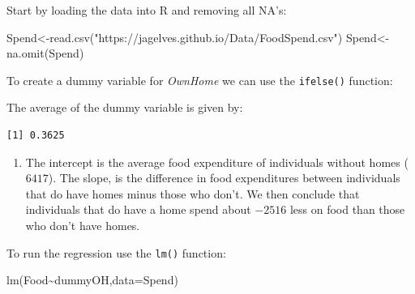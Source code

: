 \documentclass[
  letterpaper,
  DIV=11,
  numbers=noendperiod]{scrreprt}
\newenvironment{Shaded}{\begin{snugshade}}{\end{snugshade}}
\newcommand{\AttributeTok}[1]{\textcolor[rgb]{0.40,0.45,0.13}{#1}}
\newcommand{\DecValTok}[1]{\textcolor[rgb]{0.68,0.00,0.00}{#1}}
\newcommand{\FunctionTok}[1]{\textcolor[rgb]{0.28,0.35,0.67}{#1}}
\newcommand{\NormalTok}[1]{\textcolor[rgb]{0.00,0.23,0.31}{#1}}
\newcommand{\OtherTok}[1]{\textcolor[rgb]{0.00,0.23,0.31}{#1}}
\newcommand{\SpecialCharTok}[1]{\textcolor[rgb]{0.37,0.37,0.37}{#1}}
\newcommand{\StringTok}[1]{\textcolor[rgb]{0.13,0.47,0.30}{#1}}
\providecommand{\tightlist}{%
  \setlength{\itemsep}{0pt}\setlength{\parskip}{0pt}}\usepackage{longtable,booktabs,array}
\begin{document}
Start by loading the data into R and removing all NA's:

\begin{Shaded}
\begin{Highlighting}[numbers=left,,]
\NormalTok{Spend}\OtherTok{\textless{}{-}}\FunctionTok{read.csv}\NormalTok{(}\StringTok{"https://jagelves.github.io/Data/FoodSpend.csv"}\NormalTok{)}
\NormalTok{Spend}\OtherTok{\textless{}{-}}\FunctionTok{na.omit}\NormalTok{(Spend)}
\end{Highlighting}
\end{Shaded}

To create a dummy variable for \emph{OwnHome} we can use the
\texttt{ifelse()} function:

\begin{Shaded}
\end{Shaded}

The average of the dummy variable is given by:

\begin{Shaded}
\end{Shaded}

\begin{verbatim}
[1] 0.3625
\end{verbatim}

\begin{enumerate}
\def\labelenumi{\arabic{enumi}.}
\setcounter{enumi}{1}
\tightlist
\item
  The intercept is the average food expenditure of individuals without
  homes (\(6417\)). The slope, is the difference in food expenditures
  between individuals that do have homes minus those who don't. We then
  conclude that individuals that do have a home spend about \(-2516\)
  less on food than those who don't have homes.
\end{enumerate}

To run the regression use the \texttt{lm()} function:

\begin{Shaded}
\begin{Highlighting}[numbers=left,,]
\FunctionTok{lm}\NormalTok{(Food}\SpecialCharTok{\textasciitilde{}}\NormalTok{dummyOH,}\AttributeTok{data=}\NormalTok{Spend)}
\end{Highlighting}
\end{Shaded}
\end{document}
